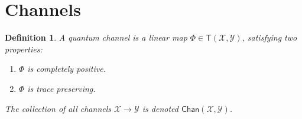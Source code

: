 \documentclass[aps,pra,onecolumn,notitlepage,superscriptaddress]{revtex4-1}
\newcommand{\spc}[1]{\mathcal{#1}}
\newcommand{\T}{\mathsf{T}}
\newcommand{\Chan}{{\mathsf{Chan}}}
\newtheorem{defi}{Definition}
\begin{document}
    \section{Channels}
    \begin{defi}
        A quantum channel is a linear map $\Phi \in \T(\spc X, \spc Y)$, satisfying two properties:
        \begin{enumerate}
            \item $\Phi$ is completely positive.
            \item $\Phi$ is trace preserving.
        \end{enumerate}

        The collection of all channels $\spc X \to \spc Y$ is denoted $\Chan(\spc X, \spc Y)$.
    \end{defi}
\end{document}
